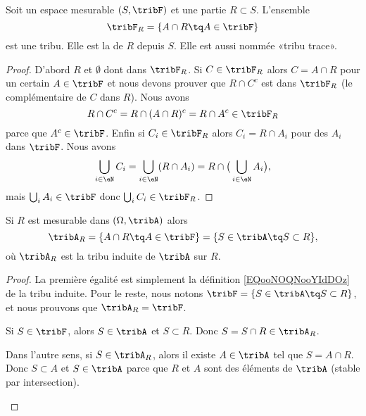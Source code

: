 \begin{propositionDef}      \label{DefDHTTooWNoKDP}
	Soit un espace mesurable \( (S,\tribF)  \) et une partie \( R\subset S\). L'ensemble
	\begin{equation}        \label{EQooNOQNooYIdDOz}
		\tribF_R=\{ A\cap R\tq A\in\tribF \}
	\end{equation}
	est une tribu. Elle est la  de \( R\) depuis \( S\). Elle est aussi nommée «tribu trace».
\end{propositionDef}

\begin{proof}
	D'abord \( R\) et \( \emptyset\) dont dans \( \tribF_R\). Si \( C\in\tribF_R \) alors \( C=A\cap R\) pour un certain \( A\in \tribF\) et nous devons prouver que \( R\cap C^c\) est dans \( \tribF_R\) (le complémentaire de \( C\) dans \( R\)). Nous avons
	\begin{equation}
		R\cap C^c=R\cap(A\cap R)^c=R\cap A^c\in \tribF_R
	\end{equation}
	parce que \( A^c\in \tribF\). Enfin si \( C_i\in \tribF_R\) alors \( C_i=R\cap A_i\) pour des \( A_i\) dans \( \tribF\). Nous avons
	\begin{equation}
		\bigcup_{i\in \eN}C_i=\bigcup_{i\in \eN}(R\cap A_i)=R\cap\big( \bigcup_{i\in \eN}A_i \big),
	\end{equation}
	mais \( \bigcup_iA_i \in \tribF\) donc \( \bigcup_iC_i\in \tribF_R\).
\end{proof}

\begin{proposition}     \label{PROPooUNNSooMUQKfp}
	Si \( R\) est mesurable dans \( (\Omega,\tribA)\) alors
	\begin{equation}
		\tribA_R=\{ A\cap R\tq A\in\tribF \}=\{ S\in\tribA\tq S\subset R \},
	\end{equation}
	où \( \tribA_R\) est la tribu induite de \( \tribA\) sur \( R\).
\end{proposition}

\begin{proof}
	La première égalité est simplement la définition \eqref{EQooNOQNooYIdDOz} de la tribu induite.
	Pour le reste, nous notons \( \tribF=\{ S\in \tribA\tq S\subset R \}\), et nous prouvons que \( \tribA_R=\tribF \).

	\begin{subproof}
		Si \( S\in \tribF\), alors \( S\in \tribA\) et \( S\subset R\). Donc \( S=S\cap R\in\tribA_R\).

		Dans l'autre sens, si \( S\in \tribA_R\), alors il existe \( A\in\tribA\) tel que \( S=A\cap R\). Donc \( S\subset A\) et \( S\in\tribA\) parce que \( R\) et \( A\) sont des éléments de \( \tribA\) (stable par intersection).
	\end{subproof}
\end{proof}


